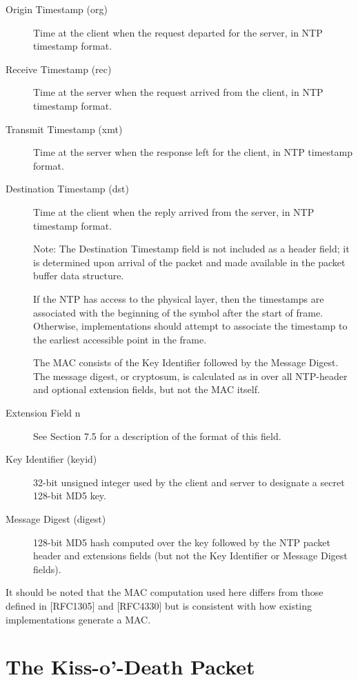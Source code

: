 \begin{description}
\item[Origin Timestamp (org)] Time at the client when the request departed
for the server, in NTP timestamp format.

\item[Receive Timestamp (rec)] Time at the server when the request arrived
from the client, in NTP timestamp format.

\item[Transmit Timestamp (xmt)] Time at the server when the response left
for the client, in NTP timestamp format.

\item[Destination Timestamp (dst)] Time at the client when the reply
arrived from the server, in NTP timestamp format.

Note: The Destination Timestamp field is not included as a header
field; it is determined upon arrival of the packet and made available
in the packet buffer data structure.

If the NTP has access to the physical layer, then the timestamps are
associated with the beginning of the symbol after the start of frame.
Otherwise, implementations should attempt to associate the timestamp
to the earliest accessible point in the frame.

The MAC consists of the Key Identifier followed by the Message
Digest. The message digest, or cryptosum, is calculated as in
\cite{RFC1321} over all NTP-header and optional extension fields, but not
the MAC itself.

\item[Extension Field n] See Section 7.5 for a description of the format of
this field.

\item[Key Identifier (keyid)] 32-bit unsigned integer used by the client
and server to designate a secret 128-bit MD5 key.

\item[Message Digest (digest)] 128-bit MD5 hash computed over the key
followed by the NTP packet header and extensions fields (but not the
Key Identifier or Message Digest fields).

\end{description}

It should be noted that the MAC computation used here differs from
those defined in [RFC1305] and [RFC4330] but is consistent with how
existing implementations generate a MAC.

\section{The Kiss-o’-Death Packet}

